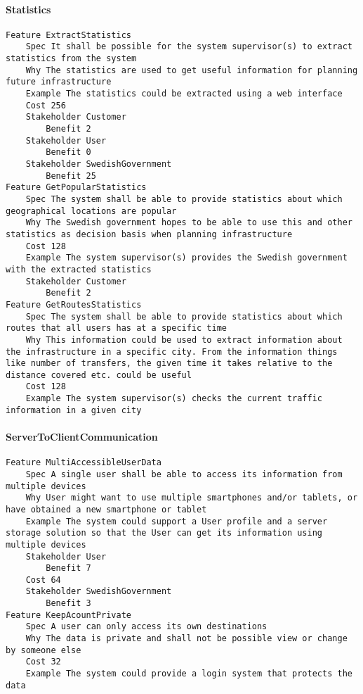 \begin{lstlisting}

\end{lstlisting}


			 \paragraph{Statistics}


\begin{lstlisting}
Feature ExtractStatistics
	Spec It shall be possible for the system supervisor(s) to extract statistics from the system
	Why The statistics are used to get useful information for planning future infrastructure
	Example The statistics could be extracted using a web interface
	Cost 256
	Stakeholder Customer
		Benefit 2
	Stakeholder User
		Benefit 0
	Stakeholder SwedishGovernment
		Benefit 25
Feature GetPopularStatistics
	Spec The system shall be able to provide statistics about which geographical locations are popular
	Why The Swedish government hopes to be able to use this and other statistics as decision basis when planning infrastructure
	Cost 128
	Example The system supervisor(s) provides the Swedish government with the extracted statistics
	Stakeholder Customer
		Benefit 2
Feature GetRoutesStatistics
	Spec The system shall be able to provide statistics about which routes that all users has at a specific time
	Why This information could be used to extract information about the infrastructure in a specific city. From the information things like number of transfers, the given time it takes relative to the distance covered etc. could be useful
	Cost 128
	Example The system supervisor(s) checks the current traffic information in a given city

\end{lstlisting}
		
				
			 \paragraph{ServerToClientCommunication}


\begin{lstlisting}
Feature MultiAccessibleUserData
	Spec A single user shall be able to access its information from multiple devices
	Why User might want to use multiple smartphones and/or tablets, or have obtained a new smartphone or tablet
	Example The system could support a User profile and a server storage solution so that the User can get its information using multiple devices
	Stakeholder User
		Benefit 7
	Cost 64
	Stakeholder SwedishGovernment
		Benefit 3
Feature KeepAcountPrivate
	Spec A user can only access its own destinations
	Why The data is private and shall not be possible view or change by someone else
	Cost 32
	Example The system could provide a login system that protects the data

\end{lstlisting}
		
